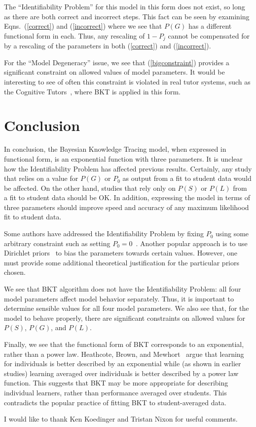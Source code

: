 \documentclass{acmlarge-edm}
\begin{document}
The ``Identifiability Problem'' for this model in this form
does not exist, so long as there are both correct and incorrect steps.
This fact can be seen by examining Eqns.~(\ref{correct}) and (\ref{incorrect})
where we see that $P(G)$ has a different functional form in each.
Thus, any rescaling of $1-P_j$ cannot be compensated for by a rescaling
of the parameters in both  (\ref{correct}) and (\ref{incorrect}).

For the ``Model Degeneracy'' issue, we see that (\ref{bigconstraint})
provides a significant constraint on allowed values of model parameters.
It would be interesting to see of often this constraint is 
violated in real tutor systems, such as the 
Cognitive Tutors~\cite{ritter_cognitive_2007}, 
where BKT is applied in this form.


\section{Conclusion}


In conclusion, the Bayesian Knowledge Tracing model, when expressed
in functional form, is an exponential function with three parameters.
It is unclear how the Identifiability Problem has affected previous
results.  Certainly, any study that relies on a value for $P(G)$ or
$P_0$ as output from a fit to student data would be affected.
On the other hand, studies that rely only on $P(S)$ or $P(L)$ from
a fit to student data should be OK.  In addition, expressing
the model in terms of three parameters should improve speed
and accuracy of any maximum likelihood fit to student data.

Some authors have addressed the Identifiability Problem by 
fixing $P_0$ using some arbitrary constraint such as setting
$P_0=0$~\cite{jose_gonzalez-brenes_dynamic_2012}. 
Another popular approach is to use Dirichlet 
priors~\cite{beck_identifiability:_2007} to bias the
parameters towards certain values.  However, one must provide
some additional theoretical justification for the
particular priors chosen.

We see that BKT algorithm does not have
the Identifiability Problem:  all four model parameters
affect model behavior separately.  Thus, it is important to determine
sensible values for all four model parameters.
We also see that, for the model to behave properly,  there are 
significant constraints on allowed values for $P(S)$, $P(G)$, and $P(L)$.

Finally, we see that the functional form of BKT corresponds 
to an exponential, rather than a power law.  
Heathcote, Brown, and Mewhort~\cite{heathcote_power_2000}
argue that learning for individuals is better described by an
exponential while (as shown in earlier studies) learning averaged
over individuals is better described by a power law function.
This suggests that BKT may be more appropriate for describing
individual learners, rather than performance averaged over students.
This contradicts the popular practice of fitting BKT to 
student-averaged data.

\begin{acks}
I would like to thank Ken Koedinger and Tristan Nixon for
useful comments.
\end{acks}


\end{document}
